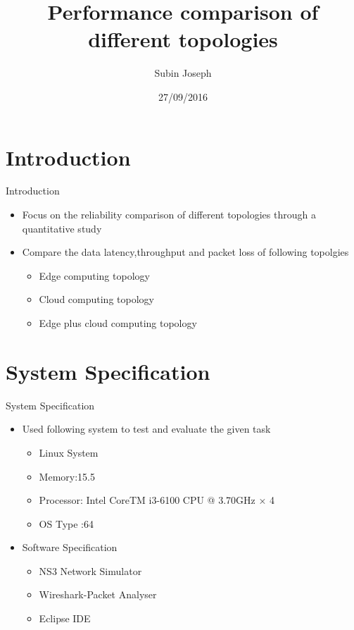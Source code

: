 \documentclass{beamer}
\title[Your Short Title]{Performance comparison of different topologies}
\author{Subin Joseph}
\institute{TU Kaiserslautern}
\date{27/09/2016}
\begin{document}
\begin{frame}
  \titlepage

\end{frame}


\section{Introduction}

\begin{frame}{Introduction}



\begin{itemize}
  \item Focus on the reliability comparison of different topologies through a quantitative study
  \item Compare the data latency,throughput and packet loss of following topolgies
  \begin{itemize}
  	\item Edge computing topology
  	\item Cloud computing topology
  	\item Edge plus cloud computing topology
  \end{itemize}

\end{itemize}


\end{frame}
\section{System Specification}
\begin{frame}{System Specification}
\begin{itemize}
  \item Used following system to test and evaluate the given task 
  \begin{itemize}
  	\item Linux System
  	\item Memory:\SI{15.5}{\giga\byte}
  	\item Processor: Intel CoreTM i3-6100 CPU @ 3.70GHz × 4 
  	\item OS Type :\SI{64}{\bit}

  \end{itemize}
\item Software Specification
  \begin{itemize}
  	\item NS3 Network Simulator
  	\item Wireshark-Packet Analyser
  	\item Eclipse IDE
  \end{itemize}
\end{itemize}
\end{frame}
\end{document}
